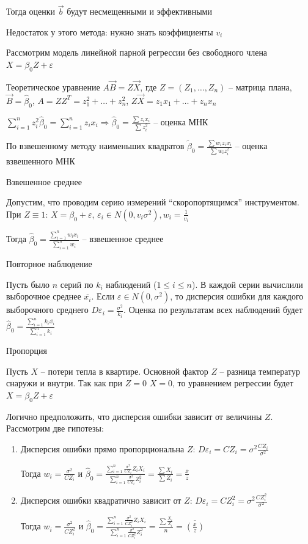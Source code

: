 Тогда оценки $\vec b$ будут несмещенными и эффективными

Недостаток у этого метода: нужно знать коэффициенты $v_i$

\Ex Рассмотрим модель линейной парной регрессии без свободного члена $X = \beta_0 Z + \varepsilon$

Теоретическое уравнение $A \vec B = Z \vec X$, где $Z = \left(Z_1, \dots, Z_n\right)$ -- матрица плана, $\vec B = \hat \beta_0$, $A = Z Z^T = z_1^2 + \dots + z_n^2$, $Z \vec X = z_1 x_1 + \dots + z_n x_n$

$\sum_{i = 1}^n z^2_i \hat \beta_0 = \sum_{i = 1}^n z_i x_i \Longrightarrow \hat \beta_0 = \frac{\sum z_i x_i}{\sum z^2_i}$ -- оценка МНК 

По взвешенному методу наименьших квадратов $\tilde \beta_0 = \frac{\sum w_i z_i x_i}{\sum w_i z_i^2}$ -- оценка взвешенного МНК

 Взвешенное среднее

Допустим, что проводим серию измерений \enquote{скоропортящимся} инструментом. При $Z \equiv 1$: $X = \beta_0 + \varepsilon$, $\varepsilon_i \in N(0, v_i \sigma^2), w_i = \frac{1}{v_i}$

Тогда $\hat \beta_0 = \frac{\sum_{i = 1}^n w_i x_i}{\sum_{i = 1}^n w_i}$ -- взвешенное среднее

 Повторное наблюдение

Пусть было $n$ серий по $k_i$ наблюдений ($1 \leq i \leq n$). В каждой серии вычислили выборочное среднее $\overline{x_i}$. 
Если $\varepsilon \in N(0, \sigma^2)$, то дисперсия ошибки для каждого выборочного среднего $D\varepsilon_i = \frac{\sigma^2}{k_i}$. Оценка по результатам всех наблюдений будет $\hat \beta_0 = \frac{\sum_{i = 1}^n k_i \overline{x_i}}{\sum_{i = 1}^n k_i}$

 Пропорция

Пусть $X$ -- потери тепла в квартире. Основной фактор $Z$ -- разница температур снаружи и внутри. Так как при $Z = 0$ $X = 0$, то уравнением регрессии будет $X = \beta_0 Z + \varepsilon$

Логично предположить, что дисперсия ошибки зависит от величины $Z$. Рассмотрим две гипотезы:

\begin{enumerate}
    \item Дисперсия ошибки прямо пропорциональна $Z$: $D\varepsilon_i = C Z_i = \sigma^2 \frac{C Z_i}{\sigma^2}$

    Тогда $w_i = \frac{\sigma^2}{C Z_i}$ и $\hat \beta_0 = \frac{\sum_{i = 1}^n \frac{\sigma^2}{C Z_i} Z_i X_i}{\sum_{i = 1}^n \frac{\sigma^2}{C Z_i} Z_i^2} = \frac{\sum X_i}{\sum Z_i} = \frac{\overline{x}}{\overline{z}}$

    \item Дисперсия ошибки квадратично зависит от $Z$: $D\varepsilon_i = C Z_i^2 = \sigma^2 \frac{C Z_i^2}{\sigma^2}$

    Тогда $w_i = \frac{\sigma^2}{C Z_i^2}$ и $\hat \beta_0 = \frac{\sum_{i = 1}^n \frac{\sigma^2}{C Z_i^2} Z_i X_i}{\sum_{i = 1}^n \frac{\sigma^2}{C Z_i^2} Z_i^2} = \frac{\sum \frac{X_i}{Z_i}}{n} = \overline{\left(\frac{x}{z}\right)}$
\end{enumerate}

